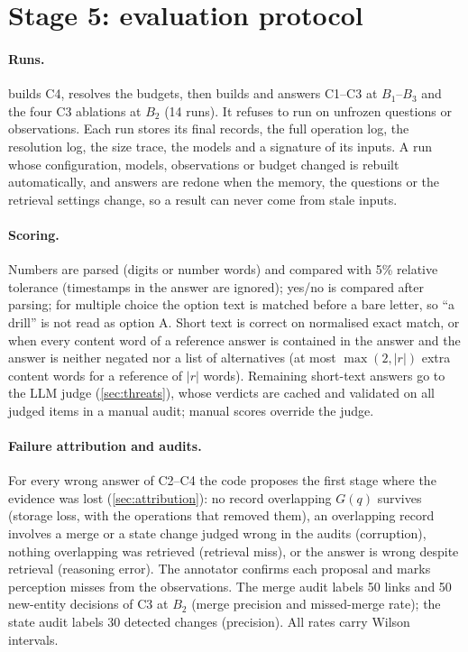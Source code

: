 \section{Stage 5: evaluation protocol}\label{sec:stage5}

\paragraph{Runs.}
 builds C4, resolves the budgets, then builds and answers
C1--C3 at $B_1$--$B_3$ and the four C3 ablations at $B_2$ (14 runs). It
refuses to run on unfrozen questions or observations. Each run stores its
final records, the full operation log, the resolution log, the size trace,
the models and a signature of its inputs. A run whose configuration, models,
observations or budget changed is rebuilt automatically, and answers are redone
when the memory, the questions or the retrieval settings change, so a result
can never come from stale inputs.

\paragraph{Scoring.}\label{sec:scoring}
Numbers are parsed (digits or number words) and compared with 5\% relative
tolerance (timestamps in the answer are ignored); yes/no is compared after
parsing; for multiple choice the option text is matched before a bare letter,
so ``a drill'' is not read as option A. Short text is correct on normalised exact
match, or when every content word of a reference answer is contained in the
answer and the answer is neither negated nor a list of alternatives (at most
$\max(2,|r|)$ extra content words for a reference of $|r|$ words). Remaining short-text answers go to the LLM judge
(\cref{sec:threats}), whose verdicts are cached and validated on all judged
items in a manual audit; manual scores override the judge.

\paragraph{Failure attribution and audits.}
For every wrong answer of C2--C4 the code proposes the first stage where the
evidence was lost (\cref{sec:attribution}): no record overlapping $G(q)$
survives (storage loss, with the operations that removed them), an
overlapping record involves a merge or a state change judged wrong in the
audits (corruption), nothing overlapping was retrieved (retrieval miss), or
the answer is wrong despite retrieval (reasoning error). The annotator
confirms each proposal and marks perception misses from the observations.
The merge audit labels 50 links and 50 new-entity
decisions of C3 at $B_2$ (merge precision and missed-merge rate); the state
audit labels 30 detected changes (precision). All rates carry Wilson
intervals.

